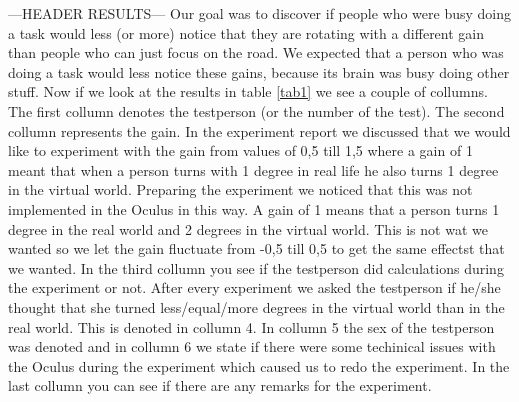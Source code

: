 ---HEADER RESULTS---
Our goal was to discover if people who were busy doing a task would less (or more) notice that they are rotating with a different gain than people who can just focus on the road. We expected that a person who was doing a task would less notice these gains, because its brain was busy doing other stuff. Now if we look at the results in table \ref{tab1} we see a couple of collumns. The first collumn denotes the testperson (or the number of the test). The second collumn represents the gain. In the experiment report we discussed that we would like to experiment with the gain from values of 0,5 till 1,5 where a gain of 1 meant that when a person turns with 1 degree in real life he also turns 1 degree in the virtual world. Preparing the experiment we noticed that this was not implemented in the Oculus in this way. A gain of 1 means that a person turns 1 degree in the real world and 2 degrees in the virtual world. This is not wat we wanted so we let the gain fluctuate from -0,5 till 0,5 to get the same effectst that we wanted. In the third collumn you see if the testperson did calculations during the experiment or not. After every experiment we asked the testperson if he/she thought that she turned less/equal/more degrees in the virtual world than in the real world. This is denoted in collumn 4. In collumn 5 the sex of the testperson was denoted and in collumn 6 we state if there were some techinical issues with the Oculus during the experiment which caused us to redo the experiment. In the last collumn you can see if there are any remarks for the experiment.